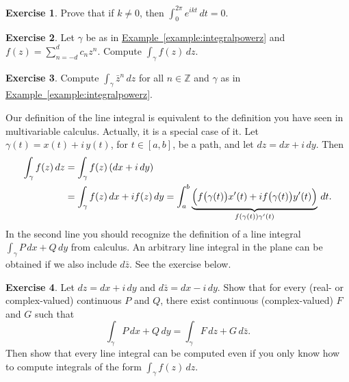 \documentclass[12pt,openany]{book}
\newcommand{\Z}{{\mathbb{Z}}}
\theoremstyle{plain}
\theoremstyle{remark}
\theoremstyle{definition}
\newenvironment{exbox}{%
    \def\FrameCommand{\vrule width 1pt \relax\hspace{10pt}}%
    \MakeFramed{\advance\hsize-\width\FrameRestore}%
}{%
    \endMakeFramed
}
\theoremstyle{exercise}
\newtheorem{exercise}{Exercise}[section]
\theoremstyle{example}
\newcommand{\exampleref}[1]{\hyperref[#1]{Example~\ref*{#1}}}
\begin{document}
\begin{exbox}
\begin{exercise}
Prove that if $k\not= 0$, then $\int_0^{2\pi} e^{ik t} \, dt = 0$.
\end{exercise}

\begin{exercise}
Let $\gamma$ be as in \exampleref{example:integralpowerz}
and 
$f(z) = \sum_{n=-d}^d c_n z^n$.
Compute $\int_\gamma f(z) \, dz$.
\end{exercise}

\begin{exercise}
Compute $\int_\gamma \bar{z}^n \, dz$ for all $n \in \Z$ and $\gamma$ as in
\exampleref{example:integralpowerz}.
\end{exercise}
\end{exbox}

Our definition of the line integral is equivalent to the definition you
have seen in multivariable calculus.  Actually, it is a special case of it.
Let $\gamma(t) = x(t) +i \, y(t)$, for $t \in [a,b]$, be a path,
and let $dz = dx + i\, dy$.
Then
\begin{equation*}
\begin{split}
\int_{\gamma} f(z) \, dz
& =
\int_{\gamma} f(z) \, (dx + i\, dy)
\\
& =
\int_{\gamma} f(z) \, dx + i f(z) \, dy
=
\int_a^b \underbrace{\Bigl( f\bigl(\gamma(t)\bigr) x'(t) + i f\bigl(\gamma(t)\bigr) y'(t) \Bigr)}_{f(\gamma(t)) \gamma'(t)} \, dt .
\end{split}
\end{equation*}
In the second line you should recognize the definition of a line integral
$\int_\gamma P\,dx + Q \, dy$ from calculus.  An arbitrary
line integral in the plane can be obtained if we also include $d\bar{z}$.  See the
exercise below.

\begin{exbox}
\begin{exercise} \label{exercise:realpathintegral}
%
Let $dz = dx + i \, dy$ and 
$d\bar{z} = dx - i \, dy$.  Show that for every (real- or complex-valued) continuous $P$ and $Q$,
there exist continuous (complex-valued) $F$ and $G$ such that
\begin{equation*}
\int_{\gamma} P \, dx + Q \, dy
=
\int_{\gamma} F \, dz + G \, d\bar{z} .
\end{equation*}
Then show that every line integral
can be computed even if you only know how to compute integrals of the form
$\int_\gamma f(z) \, dz$.
\end{exercise}
\end{exbox}
\end{document}
